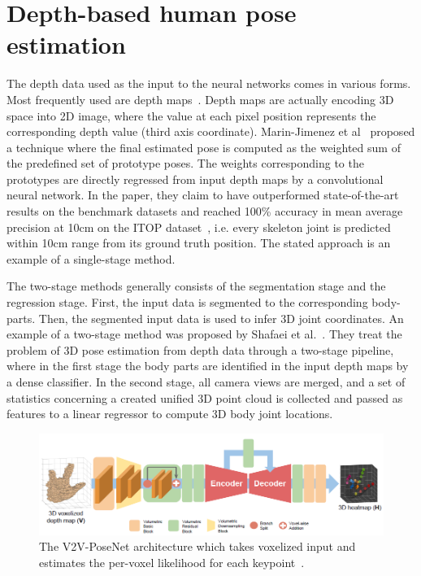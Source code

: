 \section{Depth-based human pose estimation}
\noindent The depth data used as the input to the neural networks comes in various forms. Most frequently used are depth maps~\cite{Malik2018StructureAware3H,Marin18jvcir,inproceedings,Xiong_2019_ICCV}. Depth maps are actually encoding 3D space into 2D image, where the value at each pixel position represents the corresponding depth value (third axis coordinate). Marin-Jimenez et al~\cite{Marin18jvcir} proposed a technique where the final estimated pose is computed as the weighted sum of the predefined set of prototype poses. The weights corresponding to the prototypes are directly regressed from input depth maps by a convolutional neural network. In the paper, they claim to have outperformed state-of-the-art results on the benchmark datasets and reached 100\% accuracy in mean average precision at 10cm on the ITOP dataset~\cite{haque2016viewpoint}, i.e. every skeleton joint is predicted within 10cm range from its ground truth position. The stated approach is an example of a single-stage method.\par
\vspace{5mm}
\noindent The two-stage methods generally consists of the segmentation stage and the regression stage. First, the input data is segmented to the corresponding body-parts. Then, the segmented input data is used to infer 3D joint coordinates. An example of a two-stage method was proposed by Shafaei et al.~\cite{Shafaei16}. They treat the problem of 3D pose estimation from depth data through a two-stage pipeline, where in the first stage the body parts are identified in the input depth maps by a dense classifier. In the second stage, all camera views are merged, and a set of statistics concerning a created unified 3D point cloud is collected and passed as features to a linear regressor to compute 3D body joint locations.\par

\vspace{5mm}
\begin{figure}[H]
\begin{center}
  \includegraphics[width=\textwidth]{images/related_work/v2vposenet.PNG}
  \caption[The V2V-PoseNet architecture.]{The V2V-PoseNet architecture which takes voxelized input and estimates the per-voxel likelihood for each keypoint~\cite{DBLP:journals/corr/abs-1711-07399}.}
  \label{fig:v2vposenet}
\end{center}
\end{figure}

